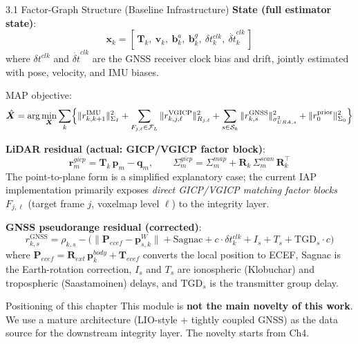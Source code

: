 \documentclass[10pt,aspectratio=169,xcolor=dvipsnames]{beamer}
\newcommand{\1}{\mathbb{1}}
\newcommand{\Fset}{\mathcal{F}}
\begin{document}
\begin{frame}{3.1 Factor-Graph Structure (Baseline Infrastructure)}
  \scriptsize
  \textbf{State (full estimator state)}:
  \[
    \bm{x}_k =
    [\,\bm{T}_k,\ \bm{v}_k,\ \bm{b}^a_k,\ \bm{b}^g_k,\
    \delta t_k^{clk},\ \dot{\delta t}_k^{clk}\,]
  \]
  where \(\delta t^{clk}\) and \(\dot{\delta t}^{clk}\) are the GNSS receiver clock bias and drift, jointly estimated with pose, velocity, and IMU biases.

  \medskip
  MAP objective:
  \[
    \hat{\bm{X}} = \arg\min_{\bm{X}} \sum_{k}\Bigl\{
      \|r^{\mathrm{IMU}}_{k,k+1}\|^2_{\Sigma_I} +
      \sum_{F_{j,\ell}\in\Fset_L}\|r^{\mathrm{VGICP}}_{k,j,\ell}\|^2_{R_{j,\ell}} +
      \sum_{s \in \mathcal{S}_k}\|r^{\mathrm{GNSS}}_{k,s}\|^2_{\sigma_{URA,s}^2}
      + \|r^{\mathrm{prior}}_0\|^2_{\Sigma_0}
    \Bigr\}
  \]

  \textbf{LiDAR residual (actual: GICP/VGICP factor block)}:
  \[
    \bm{r}^{gicp}_{m} = \bm{T}_k\,\bm{p}_m - \bm{q}_m, \qquad
    \Sigma_m^{gicp} = \Sigma_m^{map} + \bm{R}_k\,\Sigma_m^{scan}\,\bm{R}_k^\top
  \]
  The point-to-plane form is a simplified explanatory case; the current IAP implementation primarily exposes \emph{direct GICP/VGICP matching factor blocks} \(F_{j,\ell}\) (target frame \(j\), voxelmap level \(\ell\)) to the integrity layer.

  \textbf{GNSS pseudorange residual (corrected)}:
  \[
    r^{\mathrm{GNSS}}_{k,s} = \rho_{k,s} -
    \bigl(\|\bm{P}_{ecef} - \bm{p}^W_{s,k}\| + \mathrm{Sagnac}
    + c\cdot\delta t_k^{clk} + I_s + T_s + \mathrm{TGD}_s\cdot c\bigr)
  \]
  where $\bm{P}_{ecef} = \bm{R}_{ext}\,\bm{p}_k^{body} + \bm{T}_{ecef}$ converts
  the local position to ECEF, Sagnac is the Earth-rotation correction,
  $I_s$ and $T_s$ are ionospheric (Klobuchar) and tropospheric (Saastamoinen)
  delays, and $\mathrm{TGD}_s$ is the transmitter group delay.

  \medskip
  \begin{alertblock}{Positioning of this chapter}
    \footnotesize This module is \textbf{not the main novelty of this work}. We use a mature architecture (LIO-style + tightly coupled GNSS) as the data source for the downstream integrity layer. The novelty starts from Ch4.
  \end{alertblock}
\end{frame}
\end{document}
